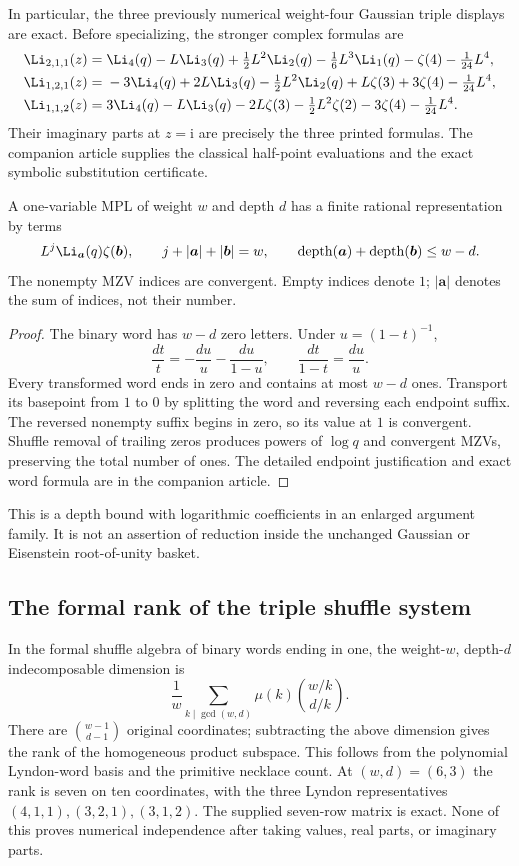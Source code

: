 In particular, the three previously numerical weight-four Gaussian
triple displays are exact. Before specializing, the stronger complex
formulas are
\begin{align}
\Li_{2,1,1}(z)
={}&\Li_4(q)-L\Li_3(q)+\tfrac12L^2\Li_2(q)
 -\tfrac16L^3\Li_1(q)-\zeta(4)-\tfrac1{24}L^4,\notag\\
\Li_{1,2,1}(z)
={}&-3\Li_4(q)+2L\Li_3(q)-\tfrac12L^2\Li_2(q)
 +L\zeta(3)+3\zeta(4)-\tfrac1{24}L^4,\notag\\
\Li_{1,1,2}(z)
={}&3\Li_4(q)-L\Li_3(q)-2L\zeta(3)
 -\tfrac12L^2\zeta(2)-3\zeta(4)-\tfrac1{24}L^4.
\label{cd:eq:triples}
\end{align}
Their imaginary parts at $z=\mathrm i$ are precisely the three
printed formulas. The companion article supplies the classical
half-point evaluations and the exact symbolic substitution certificate.

\begin{theorem}\label{cd:thm:complement}
A one-variable MPL of weight $w$ and depth $d$ has a finite rational
representation by terms
\[
 L^j\Li_{\boldsymbol a}(q)\zeta(\boldsymbol b),\qquad
 j+|\boldsymbol a|+|\boldsymbol b|=w,\qquad
 \operatorname{depth}(\boldsymbol a)+
 \operatorname{depth}(\boldsymbol b)\le w-d.
\]
The nonempty MZV indices are convergent. Empty indices denote $1$;
$|\boldsymbol a|$ denotes the sum of indices, not their number.
\end{theorem}
\begin{proof}
The binary word has $w-d$ zero letters. Under $u=(1-t)^{-1}$,
\[
 \frac{dt}{t}=-\frac{du}{u}-\frac{du}{1-u},\qquad
 \frac{dt}{1-t}=\frac{du}{u}.
\]
Every transformed word ends in zero and contains at most $w-d$ ones.
Transport its basepoint from $1$ to $0$ by splitting the word and
reversing each endpoint suffix. The reversed nonempty suffix begins
in zero, so its value at $1$ is convergent. Shuffle removal of trailing
zeros produces powers of $\log q$ and convergent MZVs, preserving the
total number of ones. The detailed endpoint justification and exact
word formula are in the companion article.
\end{proof}
This is a depth bound with logarithmic coefficients in an enlarged
argument family. It is not an assertion of reduction inside the
unchanged Gaussian or Eisenstein root-of-unity basket.

\subsection{The formal rank of the triple shuffle system}
In the formal shuffle algebra of binary words ending in one, the
weight-$w$, depth-$d$ indecomposable dimension is
\[
 \frac1w\sum_{k\mid\gcd(w,d)}\mu(k)\binom{w/k}{d/k}.
\]
There are $\binom{w-1}{d-1}$ original coordinates; subtracting the
above dimension gives the rank of the homogeneous product subspace.
This follows from the polynomial Lyndon-word basis and the primitive
necklace count. At $(w,d)=(6,3)$ the rank is seven on ten coordinates,
with the three Lyndon representatives $(4,1,1),(3,2,1),(3,1,2)$.
The supplied seven-row matrix is exact. None of this proves numerical
independence after taking values, real parts, or imaginary parts.

